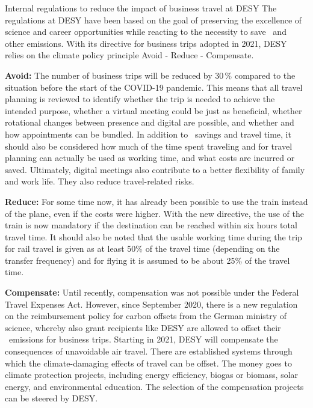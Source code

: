 \documentclass[../SustainableHEP.tex]{subfiles}
\begin{document}
\begin{bestpractice}{Internal regulations to reduce the impact of business travel at DESY}%
    The regulations at DESY have been based on the goal of preserving the excellence of science and career opportunities while reacting to the necessity to save \CdO\ and other emissions. With its directive for business trips adopted in 2021, DESY relies on the climate policy principle Avoid - Reduce - Compensate.

    \textbf{Avoid:} The number of business trips will be reduced by 30\,\% compared to the situation before the start of the COVID-19 pandemic. This means that all travel planning is reviewed to identify whether the trip is needed to achieve the intended purpose, whether a virtual meeting could be just as beneficial, whether rotational changes between presence and digital are possible, and whether and how appointments can be bundled. In addition to \CdO\ savings and travel time, it should also be considered how much of the time spent traveling and for travel planning can actually be used as working time, and what costs are incurred or saved. Ultimately, digital meetings also contribute to a better flexibility of family and work life. They also reduce travel-related risks.

    \textbf{Reduce:} For some time now, it has already been possible to use the train instead of the plane, even if the costs were higher.  With the new directive, the use of the train is now mandatory if the destination can be reached within six hours total travel time. It should also be noted that the usable working time during the trip for rail travel is given as at least 50\;\% of the travel time (depending on the transfer frequency) and for flying it is assumed to be about 25\;\% of the travel time.

    \textbf{Compensate:} Until recently, compensation was not possible under the Federal Travel Expenses Act. However, since September 2020, there is a new regulation on the reimbursement policy for carbon offsets from the German ministry of science, whereby also grant recipients like DESY are allowed to offset their \CdO\ emissions for business trips. Starting in 2021, DESY will compensate the consequences of unavoidable air travel. There are established systems through which the climate-damaging effects of travel can be offset. The money goes to climate protection projects, including energy efficiency, biogas or biomass, solar energy, and environmental education. The selection of the compensation projects can be steered by DESY. 
\end{bestpractice}
\end{document}
